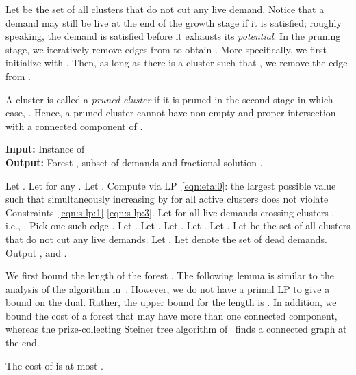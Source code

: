 Let  be the set of all clusters  that do not
cut any live demand.  
Notice that a demand  may still be live at the end of the growth stage
if it is satisfied; roughly speaking, the demand is satisfied before it exhausts
its \emph{potential}.
In the pruning stage, we
iteratively remove edges from  to obtain .  More
specifically, we first initialize  with .  Then, as long as
there is a cluster  such that , we remove the edge  from
. 

A cluster  is called a \emph{pruned cluster} if it is pruned in the
second stage in which case, .  Hence, a
pruned cluster cannot have non-empty and proper intersection with a
connected component of .


\begin{algorithm}
\caption{\label{alg:submod-pc-cluster}}
\textbf{Input:} Instance  of \\
\textbf{Output:} Forest , subset of demands  and fractional solution .

\begin{algorithmic}[1]
\STATE Let .
 \STATE Let  for any .
 \STATE Let .
\STATE Compute  via LP~\eqref{eqn:eta:0}:
the largest possible value such that simultaneously 
increasing   by  for all active clusters  does not violate Constraints~\eqref{eqn:s-lp:1}-\eqref{eqn:s-lp:3}.
\STATE Let  for all live demands  crossing clusters , i.e., .
   \STATE Pick one such edge .
   \STATE Let .
   \STATE Let .
   \STATE Let .
   \STATE Let .
  \ENDIF
\ENDWHILE
\STATE Let .
\STATE Let  be the set of all clusters  that
do not cut any live demands.
  \STATE Let .
\ENDWHILE
\STATE Let  denote the set of dead demands.
\STATE Output ,  and .
\end{algorithmic}
\end{algorithm}
















We first bound the length of the forest .
The following lemma is similar to the analysis of the algorithm in~\cite{GW95}.
However, we do not have a primal LP to give a bound on the dual.
Rather, the upper bound for the length is .
In addition, we bound the cost of a forest  that may have
more than one connected component, whereas the prize-collecting Steiner tree
algorithm of~\cite{GW95} finds a connected graph at the end.
\begin{lemma}\label{lem:submod-growth:cost}
 The cost of  is at most .
\end{lemma}

